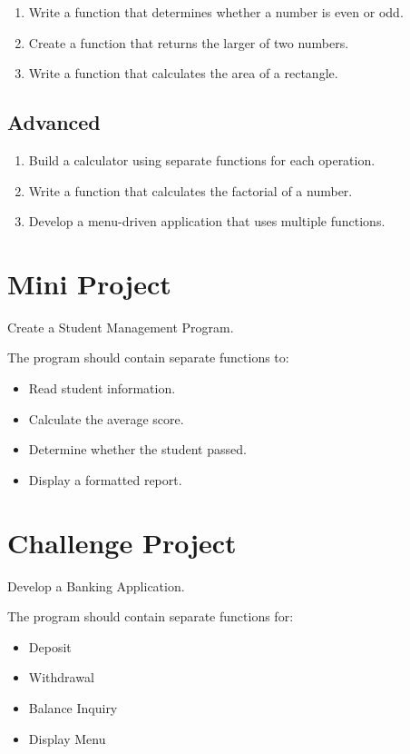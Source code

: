 \documentclass[12pt,openany]{book}
\begin{document}
\begin{enumerate}
    \item Write a function that determines whether a number is even or odd.
    \item Create a function that returns the larger of two numbers.
    \item Write a function that calculates the area of a rectangle.
\end{enumerate}

\subsection*{Advanced}

\begin{enumerate}
    \item Build a calculator using separate functions for each operation.
    \item Write a function that calculates the factorial of a number.
    \item Develop a menu-driven application that uses multiple functions.
\end{enumerate}

\section{Mini Project}

Create a Student Management Program.

The program should contain separate functions to:

\begin{itemize}
    \item Read student information.
    \item Calculate the average score.
    \item Determine whether the student passed.
    \item Display a formatted report.
\end{itemize}

\section{Challenge Project}

Develop a Banking Application.

The program should contain separate functions for:

\begin{itemize}
    \item Deposit
    \item Withdrawal
    \item Balance Inquiry
    \item Display Menu
\end{itemize}
\end{document}
